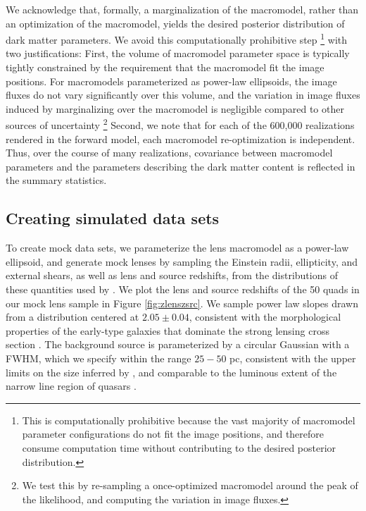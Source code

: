 We acknowledge that, formally, a marginalization of the macromodel, rather than an optimization of the macromodel, yields the desired posterior distribution of dark matter parameters. We avoid this computationally prohibitive step \footnote{This is computationally prohibitive because the vast majority of macromodel parameter configurations do not fit the image positions, and therefore consume computation time without contributing to the desired posterior distribution.} with two justifications: First, the volume of macromodel parameter space is typically tightly constrained by the requirement that the macromodel fit the image positions. For macromodels parameterized as power-law ellipsoids, the image fluxes do not vary significantly over this volume, and the variation in image fluxes induced by marginalizing over the macromodel is negligible compared to other sources of uncertainty \footnote{We test this by re-sampling a once-optimized macromodel around the peak of the likelihood, and computing the variation in image fluxes.} Second, we note that for each of the 600,000 realizations rendered in the forward model, each macromodel re-optimization is independent. Thus, over the course of many realizations, covariance between macromodel parameters and the parameters describing the dark matter content is reflected in the summary statistics. 

\subsection{Creating simulated data sets}
\label{ssec:simdata}

To create mock data sets, we parameterize the lens macromodel as a power-law ellipsoid, and generate mock lenses by sampling the Einstein radii, ellipticity, and external shears, as well as lens and source redshifts, from the distributions of these quantities used by \cite{OguriMarshall10}. We plot the lens and source redshifts of the 50 quads in our mock lens sample in Figure \ref{fig:zlenszsrc}. We sample power law slopes drawn from a distribution centered at $2.05 \pm 0.04$, consistent with the morphological properties of the early-type galaxies that dominate the strong lensing cross section \cite{Auger++10,Shankar++17}. The background source is parameterized by a circular Gaussian with a FWHM, which we specify within the range $25-50$ pc, consistent with the upper limits on the size inferred by \cite{Nierenberg++17}, and comparable to the luminous extent of the narrow line region of quasars \cite{MullerSanchez++11}. 

